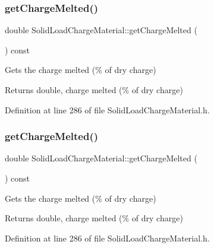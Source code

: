 \subsubsection{\texorpdfstring{get\+Charge\+Melted()}{getChargeMelted()}\hspace{0.1cm}{\footnotesize\ttfamily [2/3]}}
{\footnotesize\ttfamily double Solid\+Load\+Charge\+Material\+::get\+Charge\+Melted (\begin{DoxyParamCaption}{ }\end{DoxyParamCaption}) const\hspace{0.3cm}{\ttfamily [inline]}}

Gets the charge melted (\% of dry charge) \begin{DoxyReturn}{Returns}
double, charge melted (\% of dry charge) 
\end{DoxyReturn}


Definition at line 286 of file Solid\+Load\+Charge\+Material.\+h.

\mbox{\label{class_solid_load_charge_material_ad9ab52fe5861f48b763fe300851df69a}} 
\subsubsection{\texorpdfstring{get\+Charge\+Melted()}{getChargeMelted()}\hspace{0.1cm}{\footnotesize\ttfamily [3/3]}}
{\footnotesize\ttfamily double Solid\+Load\+Charge\+Material\+::get\+Charge\+Melted (\begin{DoxyParamCaption}{ }\end{DoxyParamCaption}) const\hspace{0.3cm}{\ttfamily [inline]}}

Gets the charge melted (\% of dry charge) \begin{DoxyReturn}{Returns}
double, charge melted (\% of dry charge) 
\end{DoxyReturn}


Definition at line 286 of file Solid\+Load\+Charge\+Material.\+h.

\mbox{\label{class_solid_load_charge_material_afcb8c00c2e23ad1444f34960b19835a0}} 
